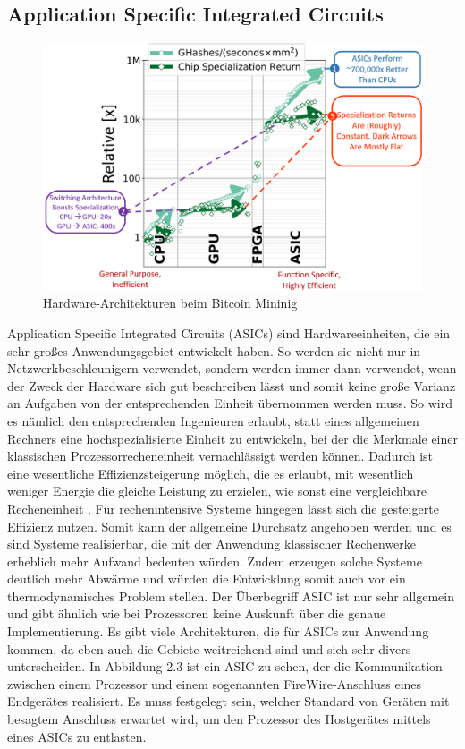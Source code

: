 \subsection{Application Specific Integrated Circuits}
\begin{figure}
    \centering
    \includegraphics[width=0.7\linewidth]{images/aisic.png}
    \caption{Hardware-Architekturen beim Bitcoin Mininig \cite{bitcoin}}
    \label{fig:enter-label}
\end{figure}
Application Specific Integrated Circuits (ASICs) sind Hardwareeinheiten, die ein sehr großes Anwendungsgebiet entwickelt haben. So werden sie nicht nur in Netzwerkbeschleunigern verwendet, sondern werden immer dann verwendet, wenn der Zweck der Hardware sich gut beschreiben lässt und somit keine große Varianz an Aufgaben von der entsprechenden Einheit übernommen werden muss. So wird es nämlich den entsprechenden Ingenieuren erlaubt, statt eines allgemeinen Rechners eine hochspezialisierte Einheit zu entwickeln, bei der die Merkmale einer klassischen Prozessorrecheneinheit vernachlässigt werden können. Dadurch ist eine wesentliche Effizienzsteigerung möglich, die es erlaubt, mit wesentlich weniger Energie die gleiche Leistung zu erzielen, wie sonst eine vergleichbare Recheneinheit \cite{asic}. Für rechenintensive Systeme hingegen lässt sich die gesteigerte Effizienz nutzen. Somit kann der allgemeine Durchsatz angehoben werden und es sind Systeme realisierbar, die mit der Anwendung klassischer Rechenwerke erheblich mehr Aufwand bedeuten würden. Zudem erzeugen solche Systeme deutlich mehr Abwärme und würden die Entwicklung somit auch vor ein thermodynamisches Problem stellen. Der Überbegriff ASIC ist nur sehr allgemein und gibt ähnlich wie bei Prozessoren keine Auskunft über die genaue Implementierung. Es gibt viele Architekturen, die für ASICs zur Anwendung kommen, da eben auch die Gebiete weitreichend sind und sich sehr divers unterscheiden. In Abbildung 2.3 ist ein ASIC zu sehen, der die Kommunikation zwischen einem Prozessor und einem sogenannten FireWire-Anschluss eines Endgerätes realisiert. Es muss festgelegt sein, welcher Standard von Geräten mit besagtem Anschluss erwartet wird, um den Prozessor des Hostgerätes mittels eines ASICs zu entlasten.
\newline

